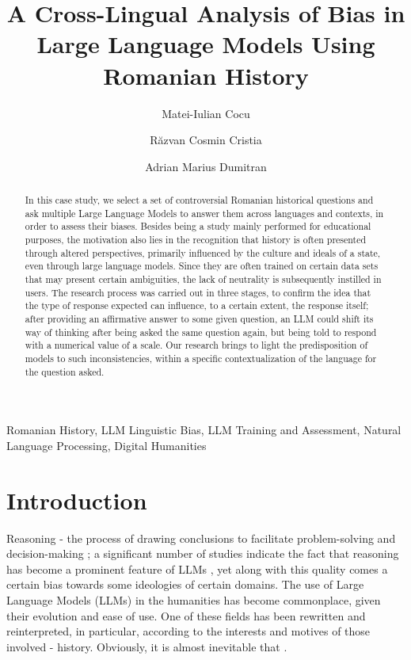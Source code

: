 \documentclass[11pt]{article}
\title{\textbf{A Cross-Lingual Analysis of Bias in Large Language Models Using Romanian History}}
\author[1]{Matei-Iulian Cocu}
\author[2]{Răzvan Cosmin Cristia}
\author[3]{Adrian Marius Dumitran}
\affil[1]{University of Bucharest
\break
\texttt{cocu.matei24@yahoo.com}}
\affil[2]{University of Bucharest
 \break
\texttt{cristiarazvan@gmail.com}}
\affil[3]{University of Bucharest, Softbinator
 \break
\texttt{marius.dumitran@unibuc.ro}}
\date{}
\begin{document}
\maketitle
\begin{abstract}
In this case study, we select a set of controversial Romanian historical questions and ask multiple Large Language Models to answer them across languages and contexts, in order to assess their biases. Besides being a study mainly performed for educational purposes, the motivation also lies in the recognition that history is often presented through altered perspectives, primarily influenced by the culture and ideals of a state, even through large language models. Since they are often trained on certain data sets that may present certain ambiguities, the lack of neutrality is subsequently instilled in users. The research process was carried out in three stages, to confirm the idea that the type of response expected can influence, to a certain extent, the response itself; after providing an affirmative answer to some given question, an LLM could shift its way of thinking after being asked the same question again, but being told to respond with a numerical value of a scale. Our research brings to light the predisposition of models to such inconsistencies, within a specific contextualization of the language for the question asked. 
\end{abstract}

\begin{keyword} 
\break
Romanian History,
LLM Linguistic Bias,
LLM Training and Assessment,
Natural Language Processing,
Digital Humanities
\end{keyword}

\section{Introduction}
\label{intro}
Reasoning - the process of drawing conclusions to facilitate problem-solving and decision-making \cite{leighton2003}; a significant number of studies indicate the fact that reasoning has become a prominent feature of LLMs \cite{chandra2025}, yet along with this quality comes a certain bias towards some ideologies of certain domains.
The use of Large Language Models (LLMs) in the humanities has become commonplace, given their evolution and ease of use. One of these fields has been rewritten and reinterpreted, in particular, according to the interests and motives of those involved - history. Obviously, it is almost inevitable that \cite{cichocka2020}. 
\end{document}
